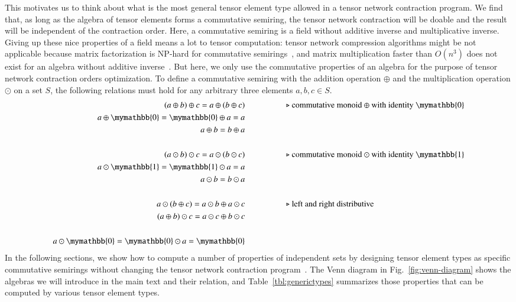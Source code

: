 \documentclass[onefignum, onetabnum]{siamart190516}
\newcommand{\<}{\langle}
\renewcommand{\>}{\rangle}
\newcommand{\Fig}[1]{Fig.~\ref{#1}}
\begin{document}
This motivates us to think about what is the most general tensor element type allowed in a tensor network contraction program.
We find that, as long as the algebra of tensor elements forms a commutative semiring, the tensor network contraction will be doable and the result will be independent of the contraction order.
Here, a commutative semiring is a field without additive inverse and multiplicative inverse.
Giving up these nice properties of a field means a lot to tensor computation: tensor network compression algorithms might be not applicable because matrix factorization is NP-hard for commutative semirings~\cite{Shitov2014}, and matrix multiplication faster than $O(n^3)$ does not exist for an algebra without additive inverse~\cite{Kerr1970}.
But here, we only use the commutative properties of an algebra for the purpose of tensor network contraction orders optimization.
To define a commutative semiring with the addition operation $\oplus$ and the multiplication operation $\odot$ on a set $S$, the following relations must hold for any arbitrary three elements $a, b, c \in S$.
\begin{align*}
(a \oplus b) \oplus c = a \oplus (b \oplus c) & \hspace{5em}\text{$\triangleright$ commutative monoid $\oplus$ with identity $\mymathbb{0}$}\\
a \oplus \mymathbb{0} = \mymathbb{0} \oplus a = a &\\
a \oplus b = b \oplus a &\\
&\\
(a \odot b) \odot c = a \odot (b \odot c)  &   \hspace{5em}\text{$\triangleright$ commutative monoid $\odot$ with identity $\mymathbb{1}$}\\
a \odot  \mymathbb{1} =  \mymathbb{1} \odot a = a &\\
a \odot b = b \odot a &\\
&\\
a \odot (b\oplus c) = a\odot b \oplus a\odot c  &  \hspace{5em}\text{$\triangleright$ left and right distributive}\\
(a\oplus b) \odot c = a\odot c \oplus b\odot c &\\
&\\
a \odot \mymathbb{0} = \mymathbb{0} \odot a = \mymathbb{0}
\end{align*}
In the following sections, we show how to compute a number of properties of independent sets by designing tensor element types as specific commutative semirings without changing the tensor network contraction program~\cite{Stepanov2014}.
The Venn diagram in \Fig{fig:venn-diagram} shows the algebras we will introduce in the main text and their relation, and Table~\ref{tbl:generictypes} summarizes those properties that can be computed by various tensor element types.
\end{document}

